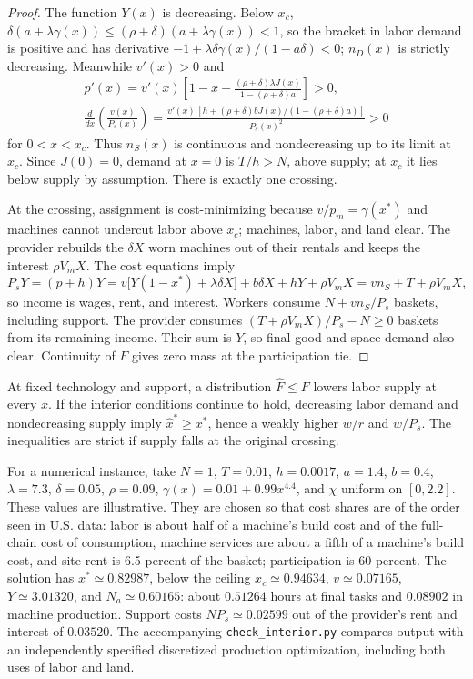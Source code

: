 \documentclass[12pt]{article}
\theoremstyle{plain}
\begin{document}
\begin{proof}
The function $Y(x)$ is decreasing. Below $x_c$, $\delta(a+\lambda\gamma(x))\le(\rho+\delta)(a+\lambda\gamma(x))<1$, so the bracket in labor demand is positive and has derivative $-1+\lambda\delta\gamma(x)/(1-a\delta)<0$; $n_D(x)$ is strictly decreasing. Meanwhile $v'(x)>0$ and
\begin{gather*}
p'(x)=v'(x)\left[1-x+\frac{(\rho+\delta)\lambda J(x)}{1-(\rho+\delta)a}\right]>0,\\
\frac{d}{dx}\left(\frac{v(x)}{P_s(x)}\right)=\frac{v'(x)\,[h+(\rho+\delta)bJ(x)/(1-(\rho+\delta)a)]}{P_s(x)^2}>0
\end{gather*}
for $0<x<x_c$. Thus $n_S(x)$ is continuous and nondecreasing up to its limit at $x_c$. Since $J(0)=0$, demand at $x=0$ is $T/h>N$, above supply; at $x_c$ it lies below supply by assumption. There is exactly one crossing.

At the crossing, assignment is cost-minimizing because $v/p_m=\gamma(x^*)$ and machines cannot undercut labor above $x_c$; machines, labor, and land clear. The provider rebuilds the $\delta X$ worn machines out of their rentals and keeps the interest $\rho V_mX$. The cost equations imply
\[
P_sY=(p+h)Y=v\bigl[Y(1-x^*)+\lambda\delta X\bigr]+b\delta X+hY+\rho V_mX=vn_S+T+\rho V_mX,
\]
so income is wages, rent, and interest. Workers consume $N+vn_S/P_s$ baskets, including support. The provider consumes $(T+\rho V_mX)/P_s-N\ge0$ baskets from its remaining income. Their sum is $Y$, so final-good and space demand also clear. Continuity of $F$ gives zero mass at the participation tie.
\end{proof}

At fixed technology and support, a distribution $\widehat{F}\le F$ lowers labor supply at every $x$. If the interior conditions continue to hold, decreasing labor demand and nondecreasing supply imply $\widehat{x}^*\ge x^*$, hence a weakly higher $w/r$ and $w/P_s$. The inequalities are strict if supply falls at the original crossing.

For a numerical instance, take $N=1$, $T=0.01$, $h=0.0017$, $a=1.4$, $b=0.4$, $\lambda=7.3$, $\delta=0.05$, $\rho=0.09$, $\gamma(x)=0.01+0.99x^{4.4}$, and $\chi$ uniform on $[0,2.2]$. These values are illustrative. They are chosen so that cost shares are of the order seen in U.S. data: labor is about half of a machine's build cost and of the full-chain cost of consumption, machine services are about a fifth of a machine's build cost, and site rent is 6.5 percent of the basket; participation is 60 percent. The solution has $x^*\simeq0.82987$, below the ceiling $x_c\simeq0.94634$, $v\simeq0.07165$, $Y\simeq3.01320$, and $N_a\simeq0.60165$: about $0.51264$ hours at final tasks and $0.08902$ in machine production. Support costs $NP_s\simeq0.02599$ out of the provider's rent and interest of $0.03520$. The accompanying \texttt{check\_interior.py} compares output with an independently specified discretized production optimization, including both uses of labor and land.
\end{document}
